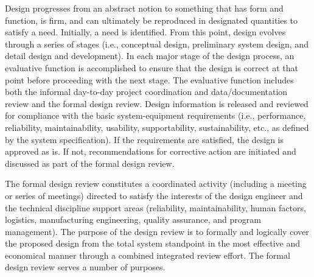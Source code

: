 Design progresses from an abstract notion to something that has form and function, is firm, and can ultimately be reproduced in designated quantities to satisfy a need. Initially, a need is identified. From this point, design evolves through a series of stages (i.e., conceptual design, preliminary system design, and detail design and development). In each major stage of the design process, an evaluative function is accomplished to ensure that the design is correct at that point before proceeding with the next stage. The evaluative function includes both the informal day-to-day project coordination and data/documentation review and the formal design review. Design information is released and reviewed for compliance with the basic system-equipment requirements (i.e., performance, reliability, maintainability, usability, supportability, sustainability, etc., as defined by the system specification). If the requirements are satisfied, the design is approved as is. If not, recommendations for corrective action are initiated and discussed as part of the formal design review.

The formal design review constitutes a coordinated activity (including a meeting or series of meetings) directed to satisfy the interests of the design engineer and the technical discipline support areas (reliability, maintainability, human factors, logistics, manufacturing engineering, quality assurance, and program management). The purpose of the design review is to formally and logically cover the proposed design from the total system standpoint in the most effective and economical manner through a combined integrated review effort. The formal design review serves a number of purposes.

